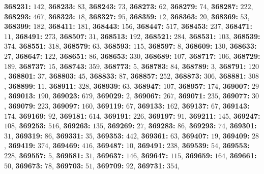\textsf{\bfseries 368231:} $142$, \textsf{\bfseries 368233:} $83$, \textsf{\bfseries 368243:} $73$, \textsf{\bfseries 368273:} $62$, \textsf{\bfseries 368279:} $74$, \textsf{\bfseries 368287:} $222$, \textsf{\bfseries 368293:} $467$, \textsf{\bfseries 368323:} $18$, \textsf{\bfseries 368327:} $95$, \textsf{\bfseries 368359:} $12$, \textsf{\bfseries 368363:} $20$, \textsf{\bfseries 368369:} $53$, \textsf{\bfseries 368399:} $182$, \textsf{\bfseries 368411:} $181$, \textsf{\bfseries 368443:} $156$, \textsf{\bfseries 368447:} $517$, \textsf{\bfseries 368453:} $237$, \textsf{\bfseries 368471:} $11$, \textsf{\bfseries 368491:} $273$, \textsf{\bfseries 368507:} $31$, \textsf{\bfseries 368513:} $192$, \textsf{\bfseries 368521:} $284$, \textsf{\bfseries 368531:} $103$, \textsf{\bfseries 368539:} $374$, \textsf{\bfseries 368551:} $318$, \textsf{\bfseries 368579:} $63$, \textsf{\bfseries 368593:} $115$, \textsf{\bfseries 368597:} $8$, \textsf{\bfseries 368609:} $130$, \textsf{\bfseries 368633:} $27$, \textsf{\bfseries 368647:} $122$, \textsf{\bfseries 368651:} $86$, \textsf{\bfseries 368653:} $330$, \textsf{\bfseries 368689:} $107$, \textsf{\bfseries 368717:} $106$, \textsf{\bfseries 368729:} $189$, \textsf{\bfseries 368737:} $15$, \textsf{\bfseries 368743:} $359$, \textsf{\bfseries 368773:} $5$, \textsf{\bfseries 368783:} $84$, \textsf{\bfseries 368789:} $3$, \textsf{\bfseries 368791:} $120$, \textsf{\bfseries 368801:} $37$, \textsf{\bfseries 368803:} $45$, \textsf{\bfseries 368833:} $87$, \textsf{\bfseries 368857:} $252$, \textsf{\bfseries 368873:} $306$, \textsf{\bfseries 368881:} $308$, \textsf{\bfseries 368899:} $11$, \textsf{\bfseries 368911:} $328$, \textsf{\bfseries 368939:} $63$, \textsf{\bfseries 368947:} $107$, \textsf{\bfseries 368957:} $174$, \textsf{\bfseries 369007:} $29$, \textsf{\bfseries 369013:} $190$, \textsf{\bfseries 369023:} $679$, \textsf{\bfseries 369029:} $2$, \textsf{\bfseries 369067:} $267$, \textsf{\bfseries 369071:} $235$, \textsf{\bfseries 369077:} $30$, \textsf{\bfseries 369079:} $223$, \textsf{\bfseries 369097:} $160$, \textsf{\bfseries 369119:} $67$, \textsf{\bfseries 369133:} $162$, \textsf{\bfseries 369137:} $67$, \textsf{\bfseries 369143:} $174$, \textsf{\bfseries 369169:} $92$, \textsf{\bfseries 369181:} $614$, \textsf{\bfseries 369191:} $226$, \textsf{\bfseries 369197:} $91$, \textsf{\bfseries 369211:} $145$, \textsf{\bfseries 369247:} $108$, \textsf{\bfseries 369253:} $516$, \textsf{\bfseries 369263:} $135$, \textsf{\bfseries 369269:} $27$, \textsf{\bfseries 369283:} $86$, \textsf{\bfseries 369293:} $74$, \textsf{\bfseries 369301:} $31$, \textsf{\bfseries 369319:} $86$, \textsf{\bfseries 369331:} $35$, \textsf{\bfseries 369353:} $442$, \textsf{\bfseries 369361:} $63$, \textsf{\bfseries 369407:} $19$, \textsf{\bfseries 369409:} $28$, \textsf{\bfseries 369419:} $374$, \textsf{\bfseries 369469:} $416$, \textsf{\bfseries 369487:} $10$, \textsf{\bfseries 369491:} $238$, \textsf{\bfseries 369539:} $54$, \textsf{\bfseries 369553:} $228$, \textsf{\bfseries 369557:} $5$, \textsf{\bfseries 369581:} $31$, \textsf{\bfseries 369637:} $146$, \textsf{\bfseries 369647:} $115$, \textsf{\bfseries 369659:} $164$, \textsf{\bfseries 369661:} $50$, \textsf{\bfseries 369673:} $78$, \textsf{\bfseries 369703:} $51$, \textsf{\bfseries 369709:} $92$, \textsf{\bfseries 369731:} $354$, 

